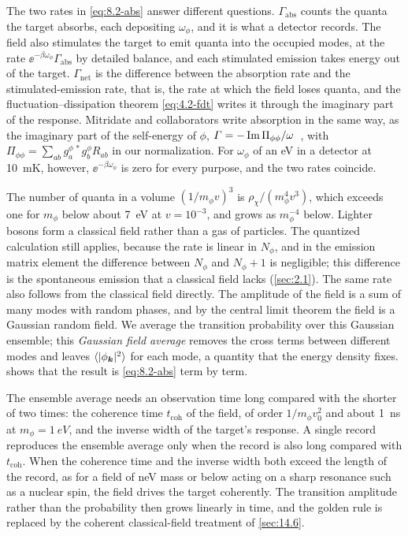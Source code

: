 The two rates in \cref{eq:8.2-abs} answer different questions. $\varGamma_{\mathrm{abs}}$ counts the quanta the target absorbs, each depositing $\omega_\phi$, and it is what a detector records. The field also stimulates the target to emit quanta into the occupied modes, at the rate $\ee^{-\beta\omega_\phi}\varGamma_{\mathrm{abs}}$ by detailed balance, and each stimulated emission takes energy out of the target. $\varGamma_{\mathrm{net}}$ is the difference between the absorption rate and the stimulated-emission rate, that is, the rate at which the field loses quanta, and the fluctuation--dissipation theorem \cref{eq:4.2-fdt} writes it through the imaginary part of the response. Mitridate and collaborators write absorption in the same way, as the imaginary part of the self-energy of $\phi$, $\varGamma = -\operatorname{Im}\Pi_{\phi\phi}/\omega$~\cite[Eqs.~(20)--(22)]{mitridate2021dark}, with $\Pi_{\phi\phi} = \sum_{ab}g^{\phi\,*}_ag^\phi_bR_{ab}$ in our normalization. For $\omega_\phi$ of an eV in a detector at \SI{10}{mK}, however, $\ee^{-\beta\omega_\phi}$ is zero for every purpose, and the two rates coincide.

The number of quanta in a volume $(1/m_\phi v)^3$ is $\rho_\chi/(m_\phi^4v^3)$, which exceeds one for $m_\phi$ below about \SI{7}{eV} at $v = 10^{-3}$, and grows as $m_\phi^{-4}$ below. Lighter bosons form a classical field rather than a gas of particles. The quantized calculation still applies, because the rate is linear in $N_\phi$, and in the emission matrix element the difference between $N_\phi$ and $N_\phi + 1$ is negligible; this difference is the spontaneous emission that a classical field lacks (\cref{sec:2.1}). The same rate also follows from the classical field directly. The amplitude of the field is a sum of many modes with random phases, and by the central limit theorem the field is a Gaussian random field. We average the transition probability over this Gaussian ensemble; this \emph{Gaussian field average} removes the cross terms between different modes and leaves $\langle|\phi_{\bm{k}}|^2\rangle$ for each mode, a quantity that the energy density fixes.  shows that the result is \cref{eq:8.2-abs} term by term.

The ensemble average needs an observation time long compared with the shorter of two times: the coherence time $t_{\mathrm{coh}}$ of the field, of order $1/m_\phi v_0^2$ and about \SI{1}{ns} at $m_\phi = \SI{1}{eV}$, and the inverse width of the target's response. A single record reproduces the ensemble average only when the record is also long compared with $t_{\mathrm{coh}}$. When the coherence time and the inverse width both exceed the length of the record, as for a field of neV mass or below acting on a sharp resonance such as a nuclear spin, the field drives the target coherently. The transition amplitude rather than the probability then grows linearly in time, and the golden rule is replaced by the coherent classical-field treatment of \cref{sec:14.6}.

